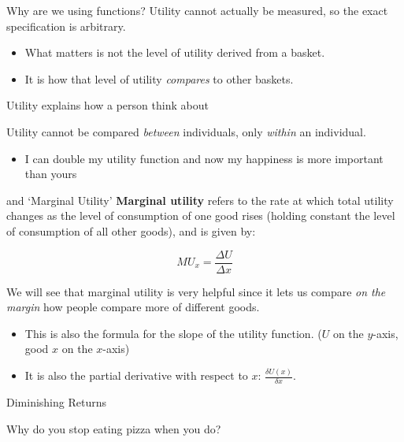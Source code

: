 \documentclass[11pt,t]{beamer}
\begin{document}
\begin{frame}{Why are we using functions?}
  Utility cannot actually be measured, so the exact specification is arbitrary.

  \begin{itemize}
    \item What matters is not the level of utility derived from a basket.
    
    \item It is how that level of utility \textit{compares} to other baskets. 
  \end{itemize}

  \pause\bigskip 
  Utility explains how a person think about 

  \pause\bigskip 
  Utility cannot be compared \textit{between} individuals, only \textit{within} an individual. 
  \begin{itemize}
    \item I can double my utility function and now my happiness is more important than yours
  \end{itemize}
\end{frame}

\begin{frame}{ and `Marginal Utility'}
  \textbf{Marginal utility} refers to the rate at which total utility changes as the level of consumption of one good rises (holding constant the level of consumption of all other goods), and is given by:

  $$ 
    MU_x = \frac{\Delta U}{\Delta	x}
  $$ 
  
  \bigskip
  We will see that marginal utility is very helpful since it lets us compare \emph{on the margin} how people compare more of different goods.

  \pause 
  \begin{itemize}
    \item This is also the formula for the slope of the utility function. ($U$ on the $y$-axis, good $x$ on the $x$-axis)
    \item It is also the partial derivative with respect to $x$: $\frac{\delta U(x)}{\delta x}$.
  \end{itemize}
\end{frame}

\begin{frame}[c]{Diminishing Returns}
  \begin{center}
    Why do you stop eating pizza when you do?
  \end{center}
\end{frame}
\end{document}
